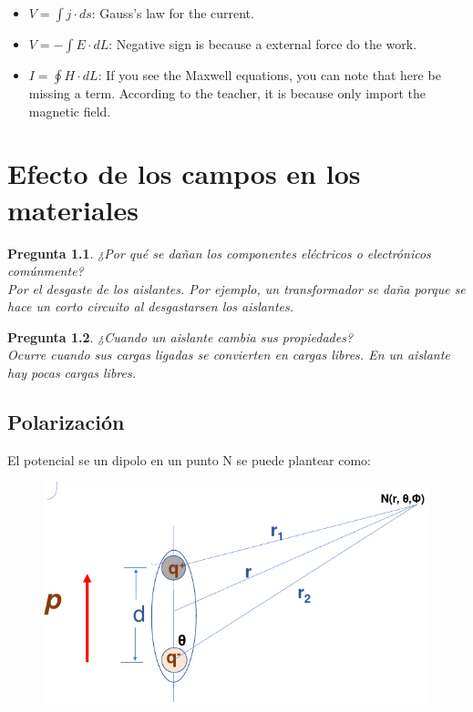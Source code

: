 \documentclass[12pt,letterpaper]{book}
\newtheorem{question}{Pregunta}[section]
\begin{document}
    \begin{itemize}
    \item $V=\int j \cdot ds$: Gauss's law for the current.
    \item $V=-\int E \cdot dL$: Negative sign is because a external force do the work.
    \item  $I=\oint H\cdot dL$: If you see the Maxwell equations, you can note that here be missing a term. According to the teacher, it is because only import the magnetic field. 

    
   
    \end{itemize}

    
\chapter{Efecto de los campos en los materiales}    

\begin{question}
¿Por qué se dañan los componentes eléctricos o electrónicos comúnmente?\\
Por el desgaste de los aislantes. Por ejemplo, un transformador se daña porque se hace un corto circuito al desgastarsen los aislantes.
\end{question}  

\begin{question}
¿Cuando un aislante cambia sus propiedades?\\
Ocurre cuando sus cargas ligadas se convierten en cargas libres. En un aislante hay pocas cargas libres.
\end{question}  
   
\section{Polarización}

El potencial se un dipolo en un punto N se puede plantear como:


\begin{figure}[H]
\centering
\includegraphics[width=.5\linewidth]{figures/pol1.png}
\caption{}
\label{pol1}
\end{figure}
\vspace{0.2cm}
\end{document}
